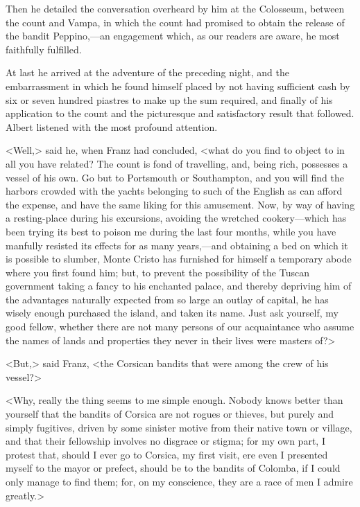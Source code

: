  Then he detailed the conversation overheard by him at the Colosseum, between the count and Vampa, in which the count had promised to obtain the release of the bandit Peppino,—an engagement which, as our readers are aware, he most faithfully fulfilled. 

 At last he arrived at the adventure of the preceding night, and the embarrassment in which he found himself placed by not having sufficient cash by six or seven hundred piastres to make up the sum required, and finally of his application to the count and the picturesque and satisfactory result that followed. Albert listened with the most profound attention. 

 <Well,> said he, when Franz had concluded, <what do you find to object to in all you have related? The count is fond of travelling, and, being rich, possesses a vessel of his own. Go but to Portsmouth or Southampton, and you will find the harbors crowded with the yachts belonging to such of the English as can afford the expense, and have the same liking for this amusement. Now, by way of having a resting-place during his excursions, avoiding the wretched cookery—which has been trying its best to poison me during the last four months, while you have manfully resisted its effects for as many years,—and obtaining a bed on which it is possible to slumber, Monte Cristo has furnished for himself a temporary abode where you first found him; but, to prevent the possibility of the Tuscan government taking a fancy to his enchanted palace, and thereby depriving him of the advantages naturally expected from so large an outlay of capital, he has wisely enough purchased the island, and taken its name. Just ask yourself, my good fellow, whether there are not many persons of our acquaintance who assume the names of lands and properties they never in their lives were masters of?> 

 <But,> said Franz, <the Corsican bandits that were among the crew of his vessel?> 

 <Why, really the thing seems to me simple enough. Nobody knows better than yourself that the bandits of Corsica are not rogues or thieves, but purely and simply fugitives, driven by some sinister motive from their native town or village, and that their fellowship involves no disgrace or stigma; for my own part, I protest that, should I ever go to Corsica, my first visit, ere even I presented myself to the mayor or prefect, should be to the bandits of Colomba, if I could only manage to find them; for, on my conscience, they are a race of men I admire greatly.> 

